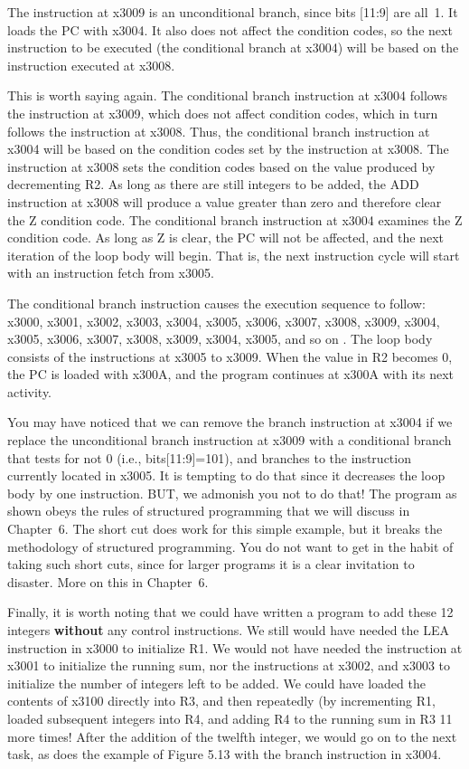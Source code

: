 \documentclass{patt}
\begin{document}
The instruction at x3009 is an unconditional branch, since bits [11:9]
are all~1. It loads the PC with x3004.  It also does not affect the
condition codes, so the next instruction to be executed (the conditional 
branch at x3004) will be based on the instruction executed at x3008.

This is worth saying again.  The conditional branch instruction at
x3004 follows the instruction at x3009, which does not affect
condition codes, which in turn follows the instruction at x3008.
Thus, the conditional branch instruction at x3004 will be based on the
condition codes set by the instruction at x3008.  The instruction at
x3008 sets the condition codes based on the value produced by
decrementing R2.  As long as there are still integers to be added, the
ADD instruction at x3008 will produce a value greater than zero and
therefore clear the Z condition code.  The conditional branch
instruction at x3004 examines the Z condition code.  As long as Z is
clear, the PC will not be affected, and the next iteration of the loop
body will begin.  That is, the next instruction cycle
will start with an instruction fetch from x3005.

The conditional branch instruction causes the execution sequence to
follow: x3000, x3001, x3002, x3003, x3004, x3005, x3006, x3007, x3008,
x3009, x3004, x3005, x3006, x3007, x3008, x3009, x3004, x3005, and so
on .  The loop body consists of the instructions at x3005 to x3009.
When the value in R2 becomes 0, the PC is loaded with x300A,
and the program continues at x300A with its next activity.

You may have noticed that we can remove the branch instruction
at x3004 if we replace the unconditional branch instruction at x3009 with 
a conditional branch that tests for not 0 (i.e., bits[11:9]=101), and 
branches to the instruction currently located in x3005.  It is tempting
to do that since it decreases the loop body by one instruction.  BUT, we
admonish you not to do that!  The program as shown obeys the rules of
structured programming that we will discuss in Chapter~6.  The short cut
does work for this simple example, but it breaks the methodology of 
structured programming.  You do not want to get in the habit of taking
such short cuts, since for larger programs it is a clear invitation to
disaster.  More on this in Chapter~6.

Finally, it is worth noting that we could have written a program to
add these 12 integers {\bf without} any control instructions.  We
still would have needed the LEA instruction in x3000 to initialize R1.
We would not have needed the instruction at x3001 to initialize the
running sum, nor the instructions at x3002, and x3003 to initialize
the number of integers left to be added.  We could have loaded the
contents of x3100 directly into R3, and then repeatedly (by
incrementing R1, loaded subsequent integers into R4, and adding R4 to
the running sum in R3 11 more times!  After the
addition of the twelfth integer, we would go on to the next task, as
does the example of Figure 5.13 with the branch instruction in x3004.
\end{document}
